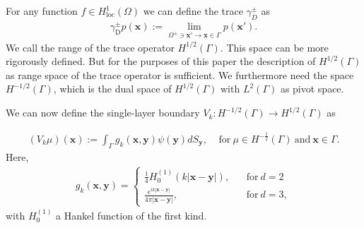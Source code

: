For any function $f\in H_{\text{loc}}^1(\Omega)$ we can define the trace $\gamma_{D}^{\pm}$ as
\begin{align*}
    \gamma_{\text{D}}^{\pm}p(\boldsymbol{x}):=\lim_{\Omega^{\pm}\ni\boldsymbol{x'}\rightarrow\boldsymbol{x}\in\Gamma}p(\boldsymbol{x'}).
\end{align*}
We call the range of the trace operator $H^{1/2}(\Gamma)$. This space can be more rigorously defined. But for the purposes of this paper the description of $H^{1/2}(\Gamma)$ as range space of the trace operator is sufficient. We furthermore need the space $H^{-1/2}(\Gamma)$, which is the dual space of $H^{1/2}(\Gamma)$ with $L^2(\Gamma)$ as pivot space.

We can now define the single-layer boundary $V_{k}:H^{-1/2}(\Gamma)\rightarrow H^{1/2}(\Gamma)$ as

\begin{align*}
    (V_{k}\mu)(\boldsymbol{x}) := \int_{\Gamma}g_{k}(\boldsymbol{x},\boldsymbol{y})\psi(\boldsymbol{y})dS_{\boldsymbol{y}}, \ \ \ \ \ 
    \text{for}\ \mu\in H^{-\frac{1}{2}}(\Gamma) \  \text{and} \ \boldsymbol{x}\in\Gamma.
\end{align*}
Here, 
\begin{align}\label{Green's function}
    g_{k}(\boldsymbol{x},\boldsymbol{y}) = \begin{cases}
          \frac{\mathrm{i}}{4}H_{0}^{(1)}(k|\boldsymbol{x}-\boldsymbol{y}|), \ \ \ \ &\text{for} \ d = 2\\
          \frac{e^{ik|\boldsymbol{x}-\boldsymbol{y}|}}{4\pi|\boldsymbol{x} - \boldsymbol{y}|}, \ \ \ \ &\text{for} \ d = 3,
        \end{cases}
\end{align}
with $H_{0}^{(1)}$  a Hankel function of the first kind.



